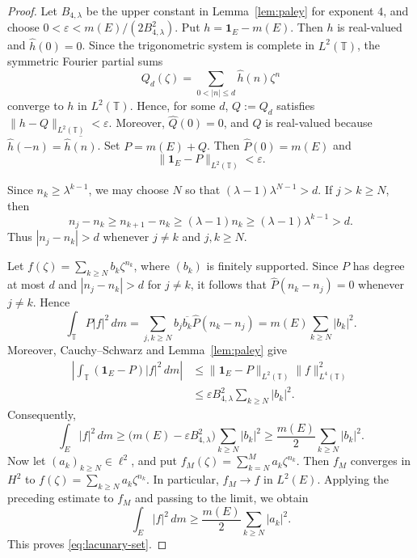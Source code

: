 \documentclass[11pt, reqno]{amsart}
\theoremstyle{definition}
\theoremstyle{remark}
\newcommand{\T}{\mathbb{T}}
\begin{document}
\begin{proof}
Let \(B_{4,\lambda}\) be the upper constant in
Lemma~\ref{lem:paley} for exponent \(4\), and choose
\(0<\varepsilon<m(E)/(2B_{4,\lambda}^2)\). Put \(h=\mathbf1_E-m(E)\). Then \(h\) is real-valued and
\(\widehat h(0)=0\). Since the trigonometric system is complete in
\(L^2(\T)\), the symmetric Fourier partial sums
\[
        Q_d(\zeta)
        =
        \sum_{0<|n|\le d}\widehat h(n)\zeta^n
\]
converge to \(h\) in \(L^2(\T)\). Hence, for some \(d\), \(Q:=Q_d\)
satisfies
\(\|h-Q\|_{L^2(\T)}<\varepsilon\). Moreover,
\(\widehat Q(0)=0\), and \(Q\) is real-valued because
\(\widehat h(-n)=\overline{\widehat h(n)}\). Set
\(P=m(E)+Q\). Then \(\widehat P(0)=m(E)\) and
\[\|\mathbf1_E-P\|_{L^2(\T)}<\varepsilon.\]

Since \(n_k\ge\lambda^{k-1}\), we may choose \(N\) so that
\((\lambda-1)\lambda^{N-1}>d\). If \(j>k\ge N\), then
\[
        n_j-n_k
        \ge
        n_{k+1}-n_k
        \ge
        (\lambda-1)n_k
        \ge
        (\lambda-1)\lambda^{k-1}
        >
        d.
\]
Thus \(|n_j-n_k|>d\) whenever \(j\ne k\) and \(j,k\ge N\).

Let \(f(\zeta)=\sum\limits_{k\ge N}b_k\zeta^{n_k}\), where \((b_k)\) is
finitely supported. Since \(P\) has degree at most \(d\) and
\(|n_j-n_k|>d\) for \(j\ne k\), it follows that
\(\widehat P(n_k-n_j)=0\) whenever \(j\ne k\). Hence
\[
        \int_\T P|f|^2\,dm
        =
        \sum_{j,k\ge N}
        b_j\overline{b_k}\widehat P(n_k-n_j)
        =
        m(E)\sum_{k\ge N}|b_k|^2.
\]
Moreover, Cauchy--Schwarz and
Lemma~\ref{lem:paley} give
\[
\begin{aligned}
        \left|
        \int_\T(\mathbf1_E-P)|f|^2\,dm
        \right|
        &\le
        \|\mathbf1_E-P\|_{L^2(\T)}
        \|f\|_{L^4(\T)}^2                                      \\
        &\le
        \varepsilon B_{4,\lambda}^2
        \sum_{k\ge N}|b_k|^2.
\end{aligned}
\]
Consequently,
\[
        \int_E|f|^2\,dm
        \ge
        \bigl(m(E)-\varepsilon B_{4,\lambda}^2\bigr)
        \sum_{k\ge N}|b_k|^2
        \ge
        \frac{m(E)}{2}
        \sum_{k\ge N}|b_k|^2.
\]
Now let \((a_k)_{k\ge N}\in\ell^2\), and put
\(
f_M(\zeta)
=
\sum\limits_{k=N}^M a_k\zeta^{n_k}.
\)
Then \(f_M\) converges in \(H^2\) to
\(
 f(\zeta)
=
\sum\limits_{k\ge N}a_k\zeta^{n_k}.
\)
In particular, \(f_M\to f\) in \(L^2(E)\). Applying the preceding
estimate to \(f_M\) and passing to the limit, we obtain
\[
        \int_E|f|^2\,dm
        \ge
        \frac{m(E)}{2}
        \sum_{k\ge N}|a_k|^2.
\]
This proves \eqref{eq:lacunary-set}.
\end{proof}
\end{document}
